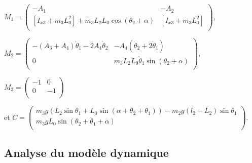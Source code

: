 \begin{corrige}
$M_1 = \begin{pmatrix}
-A_1 & - A_2 \\
\left[I_{x 3}+m_{3} L_{0}^{2}\right]  +m_{3} L_{2} L_{0}\cos \left(\theta_{2}+\alpha\right) & \left[I_{x 3}+m_{3} L_{0}^{2}\right] \\
\end{pmatrix}$,

$M_2 = \begin{pmatrix}
-\left(A_{3}+A_4\right) \dot{\theta}_{1}-2A_4 \dot{\theta}_2  & -A_4\left(\dot{\theta}_2+2\dot{\theta}_1\right) \\
0 & m_{3} L_{2} L_{0} \dot{\theta}_{1} \sin \left(\theta_{2}+\alpha\right) \\
\end{pmatrix}$, 

$M_3 = \begin{pmatrix}
- 1 & 0 \\
0 & - 1  \\
\end{pmatrix}$

et 
$C = \begin{pmatrix}
 m_3 g\left(  L_2 \sin \theta_1 +  L_0 \sin\left( \alpha + \theta_2 + \theta_1\right)\right) - m_2 g\left( l_2 - L_2\right) \sin \theta_1 \\
m_{3} g L_{0} \sin \left(\theta_{2}+\theta_{1}+\alpha\right) \\
\end{pmatrix}$.



\end{corrige}\else\fi


\subsection{Analyse du modèle dynamique}



